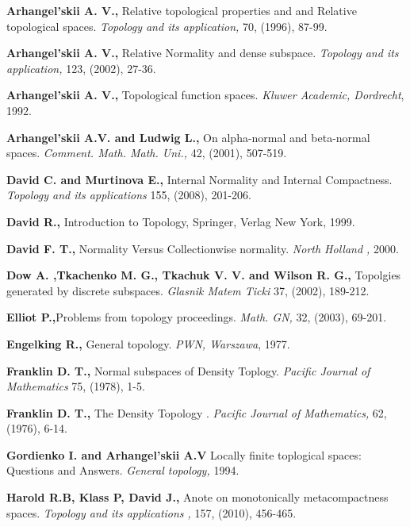 \documentclass[PhD,14,a4paper]{report}
\theoremstyle{plain}
\theoremstyle{definition}
\theoremstyle{remark}
\numberwithin{figure}{section}
\numberwithin{equation}{subsection}
\begin{document}
{\begin{thebibliography}{12}
\label{Arh2}
\textbf{ Arhangel'skii A. V.,} Relative topological properties and and Relative topological spaces.\textit{ Topology and its application,}  70, (1996), 87-99.

\label{Arh3}
 \textbf{Arhangel'skii A. V.,} Relative Normality and dense subspace.\textit{ Topology and its application,} 123, (2002), 27-36.

\label{Arh4}
\textbf{Arhangel'skii A. V.,} Topological function spaces.\textit{ Kluwer Academic, Dordrecht}, 1992.

\label{Arh5}
\textbf{ Arhangel'skii A.V. and Ludwig L., } On alpha-normal and beta-normal spaces.\textit{ Comment. Math. Math. Uni.,} 42, (2001), 507-519.

\label{Dav1}
\textbf{ David C. and  Murtinova E.,} Internal Normality and Internal Compactness.\textit{ Topology and its applications } 155, (2008), 201-206.

\label{Dav2}
\textbf{ David R.,}  Introduction to Topology, Springer, Verlag New York, 1999.

\label{Dav3}
\textbf{ David F. T.,} Normality Versus Collectionwise normality. \textit{ North Holland ,} 2000.

\label{Dow}
\textbf{ Dow A. ,Tkachenko M. G., Tkachuk V. V.  and Wilson R. G.,} Topolgies generated by discrete subspaces. \textit{Glasnik Matem Ticki }  37, (2002), 189-212.

\label{Ell}
\textbf{ Elliot P.,}Problems from topology proceedings.\textit{ Math. GN,} 32, (2003), 69-201.

\label{Eng}
\textbf{ Engelking R.,} General topology.\textit{ PWN, Warszawa}, 1977.

\label{Fran1}
\textbf{ Franklin D. T.,} Normal subspaces of Density Toplogy.\textit{ Pacific Journal of Mathematics} 75, (1978), 1-5.

\label{Fran2}
\textbf{Franklin D. T.,} The Density Topology .\textit{ Pacific Journal of Mathematics,} 62, (1976), 6-14.

\label{Gor}
\textbf{ Gordienko I. and Arhangel'skii A.V } Locally finite toplogical spaces: Questions and Answers.\textit{ General topology,} 1994.

\label{Hor}
\textbf{ Harold R.B, Klass P, David J.,} Anote on monotonically metacompactness spaces. \textit{Topology and its applications ,} 157, (2010),  456-465.


\end{thebibliography}}
\end{document}
